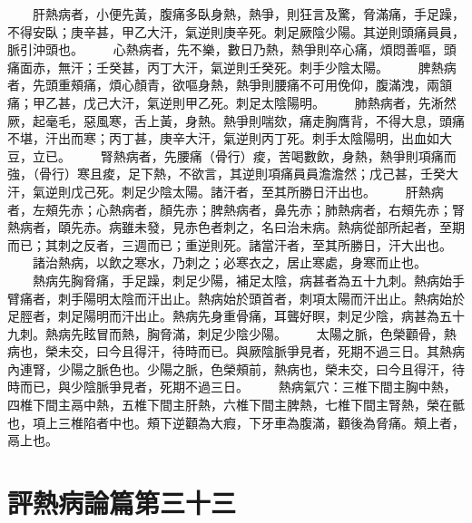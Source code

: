 　　肝熱病者，小便先黃，腹痛多臥身熱，熱爭，則狂言及驚，脅滿痛，手足躁，不得安臥；庚辛甚，甲乙大汗，氣逆則庚辛死。刺足厥陰少陽。其逆則頭痛員員，脈引沖頭也。
　　心熱病者，先不樂，數日乃熱，熱爭則卒心痛，煩悶善嘔，頭痛面赤，無汗；壬癸甚，丙丁大汗，氣逆則壬癸死。刺手少陰太陽。
　　脾熱病者，先頭重頰痛，煩心顏青，欲嘔身熱，熱爭則腰痛不可用俛仰，腹滿洩，兩頷痛；甲乙甚，戊己大汗，氣逆則甲乙死。刺足太陰陽明。
　　肺熱病者，先淅然厥，起毫毛，惡風寒，舌上黃，身熱。熱爭則喘欬，痛走胸膺背，不得大息，頭痛不堪，汗出而寒；丙丁甚，庚辛大汗，氣逆則丙丁死。刺手太陰陽明，出血如大豆，立已。
　　腎熱病者，先腰痛（骨行）痠，苦喝數飲，身熱，熱爭則項痛而強，（骨行）寒且痠，足下熱，不欲言，其逆則項痛員員澹澹然；戊己甚，壬癸大汗，氣逆則戊己死。刺足少陰太陽。諸汗者，至其所勝日汗出也。
　　肝熱病者，左頰先赤；心熱病者，顏先赤；脾熱病者，鼻先赤；肺熱病者，右頰先赤；腎熱病者，頤先赤。病雖未發，見赤色者刺之，名曰治未病。熱病從部所起者，至期而已；其刺之反者，三週而已；重逆則死。諸當汗者，至其所勝日，汗大出也。
　　諸治熱病，以飲之寒水，乃刺之；必寒衣之，居止寒處，身寒而止也。
　　熱病先胸脅痛，手足躁，刺足少陽，補足太陰，病甚者為五十九刺。熱病始手臂痛者，刺手陽明太陰而汗出止。熱病始於頭首者，刺項太陽而汗出止。熱病始於足脛者，刺足陽明而汗出止。熱病先身重骨痛，耳聾好瞑，刺足少陰，病甚為五十九刺。熱病先眩冒而熱，胸脅滿，刺足少陰少陽。
　　太陽之脈，色榮顴骨，熱病也，榮未交，曰今且得汗，待時而已。與厥陰脈爭見者，死期不過三日。其熱病內連腎，少陽之脈色也。少陽之脈，色榮頰前，熱病也，榮未交，曰今且得汗，待時而已，與少陰脈爭見者，死期不過三日。
　　熱病氣穴：三椎下間主胸中熱，四椎下間主鬲中熱，五椎下間主肝熱，六椎下間主脾熱，七椎下間主腎熱，榮在骶也，項上三椎陷者中也。頰下逆顴為大瘕，下牙車為腹滿，顴後為脅痛。頰上者，鬲上也。


\section{評熱病論篇第三十三}

